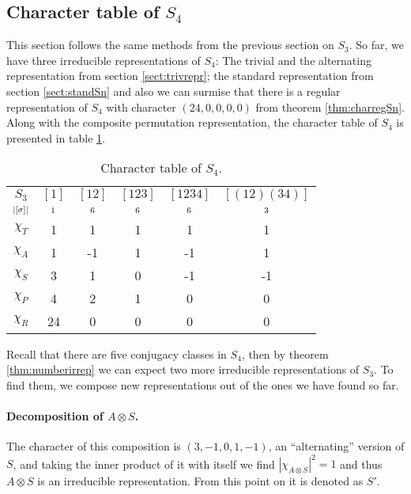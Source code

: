 \subsection{Character table of $S_4$}

This section follows the same methods from the previous section on $S_3$. So far, we have three irreducible representations of $S_4$: The trivial and the alternating representation from section \ref{sect:trivrepr}; the standard representation from section \ref{sect:standSn} and also we can surmise that there is a regular representation of $S_4$ with character $(24,0,0,0,0)$ from theorem \ref{thm:charregSn}. Along with the composite permutation representation, the character table of $S_4$ is presented in table \ref{table:charS4}. 

\begin{table}[hbt!]
	\centering
	\begin{tabular}{c | c c c c c}
		     $S_3$      & $[1]$   & $[12]$  & $[123]$ & $[1234]$ & $[(12)(34)]$ \\
		$\scriptstyle|[\sigma]|$ & $\scriptstyle 1$ & $\scriptstyle 6$ & $\scriptstyle 6$ & $\scriptstyle 6$  & $\scriptstyle 3$      \\ \hline
		   $\chi_T$     & 1       & 1       & 1       & 1        & 1            \\
		   $\chi_A$     & 1       & -1      & 1       & -1       & 1            \\
		   $\chi_S$     & 3       & 1       & 0       & -1       & -1           \\ \hline\hline
		   $\chi_P$     & 4       & 2       & 1       & 0        & 0            \\
		   $\chi_R$     & 24      & 0       & 0       & 0        & 0            	\end{tabular}
	\caption{Character table of $S_4$.}
	\label{table:charS4}
\end{table}

Recall that there are five conjugacy classes in $S_4$, then by theorem \ref{thm:numberirrep} we can expect two more irreducible representations of $S_3$. To find them, we compose new representations out of the ones we have found so far.

\paragraph{Decomposition of $A \otimes S$.} The character of this composition is $(3,-1,0,1,-1)$, an ``alternating'' version of $S$, and taking the inner product of it with itself we find $|\chi_{A \otimes S}|^2 = 1$ and thus $A \otimes S$ is an irreducible representation. From this point on it is denoted as $S'$.

